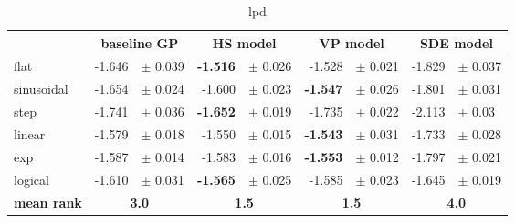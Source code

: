 \begin{table}[] 
 \centering
\begin{tabular}{lrlrlrlrl}
\hline
 &  \multicolumn{2}{c}{baseline GP}  &  \multicolumn{2}{c}{HS model}  &  \multicolumn{2}{c}{VP model}  &  \multicolumn{2}{c}{SDE model}  \\
\hline
flat & -1.646 & $\pm$ 0.039 & \textbf{-1.516} & $\pm$ 0.026 & -1.528 & $\pm$ 0.021 & -1.829 & $\pm$ 0.037 \\
sinusoidal & -1.654 & $\pm$ 0.024 & -1.600 & $\pm$ 0.023 & \textbf{-1.547} & $\pm$ 0.026 & -1.801 & $\pm$ 0.031 \\
step & -1.741 & $\pm$ 0.036 & \textbf{-1.652} & $\pm$ 0.019 & -1.735 & $\pm$ 0.022 & -2.113 & $\pm$ 0.03 \\
linear & -1.579 & $\pm$ 0.018 & -1.550 & $\pm$ 0.015 & \textbf{-1.543} & $\pm$ 0.031 & -1.733 & $\pm$ 0.028 \\
exp & -1.587 & $\pm$ 0.014 & -1.583 & $\pm$ 0.016 & \textbf{-1.553} & $\pm$ 0.012 & -1.797 & $\pm$ 0.021 \\
logical & -1.610 & $\pm$ 0.031 & \textbf{-1.565} & $\pm$ 0.025 & -1.585 & $\pm$ 0.023 & -1.645 & $\pm$ 0.019 \\
\hline
\textbf{mean rank} & \multicolumn{2}{c}{\textbf{3.0}} & \multicolumn{2}{c}{\textbf{1.5}} & \multicolumn{2}{c}{\textbf{1.5}} & \multicolumn{2}{c}{\textbf{4.0}}\\
\hline
\end{tabular}
\caption{lpd}
\label{tab:lpd}
\end{table}
